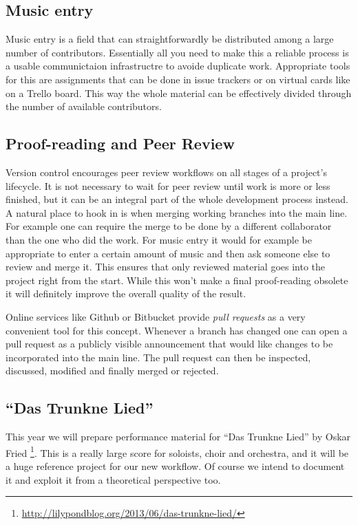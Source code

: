 \documentclass[11pt,a4paper]{article}
\begin{document}
\subsection{Music entry}
Music entry is a field that can straightforwardly be distributed among a large number
of contributors. Essentially all you need to make this a reliable process is a usable
communictaion infrastructre to avoide duplicate work.
Appropriate tools for this are assignments that can be done in issue trackers or on
virtual cards like on a Trello board. This way the whole material can be
effectively divided through the number of available contributors.

\subsection{Proof-reading and Peer Review}\label{sec:proof-reading-and-peer-review}
Version control encourages peer review workflows on all stages of a project's lifecycle.
It is not necessary to wait for peer review until work is more or less finished, but it
can be an integral part of the whole development process instead. A natural place to hook
in is when merging working branches into the main line. For example one can require the
merge to be done by a different collaborator than the one who did the work. For music entry
it would for example be appropriate to enter a certain amount of music and then ask someone
else to review and merge it.
This ensures that only reviewed material goes into the project right from the
start. While this won't make a final proof-reading obsolete it will definitely improve
the overall quality of the result.

Online services like Github or Bitbucket provide \emph{pull requests} as a very convenient
tool for this concept. Whenever a branch has changed one can open a pull request as a
publicly visible announcement that would like changes to be incorporated into the main line.
The pull request can then be inspected, discussed, modified and finally merged or rejected.

\subsection{“Das Trunkne Lied”}
This year we will prepare performance material for “Das Trunkne Lied” by Oskar Fried%
\footnote{\url{http://lilypondblog.org/2013/06/das-trunkne-lied/}}.
This is a really large score for soloists, choir and orchestra, and it will be a
huge reference project for our new workflow. Of course we intend to document it
and exploit it from a theoretical perspective too.
\end{document}
